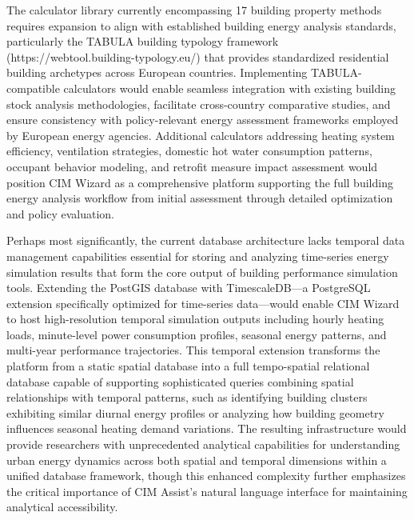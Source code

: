 The calculator library currently encompassing 17 building property methods requires expansion to align with established building energy analysis standards, particularly the TABULA building typology framework (https://webtool.building-typology.eu/) that provides standardized residential building archetypes across European countries. Implementing TABULA-compatible calculators would enable seamless integration with existing building stock analysis methodologies, facilitate cross-country comparative studies, and ensure consistency with policy-relevant energy assessment frameworks employed by European energy agencies. Additional calculators addressing heating system efficiency, ventilation strategies, domestic hot water consumption patterns, occupant behavior modeling, and retrofit measure impact assessment would position CIM Wizard as a comprehensive platform supporting the full building energy analysis workflow from initial assessment through detailed optimization and policy evaluation.

Perhaps most significantly, the current database architecture lacks temporal data management capabilities essential for storing and analyzing time-series energy simulation results that form the core output of building performance simulation tools. Extending the PostGIS database with TimescaleDB—a PostgreSQL extension specifically optimized for time-series data—would enable CIM Wizard to host high-resolution temporal simulation outputs including hourly heating loads, minute-level power consumption profiles, seasonal energy patterns, and multi-year performance trajectories. This temporal extension transforms the platform from a static spatial database into a full tempo-spatial relational database capable of supporting sophisticated queries combining spatial relationships with temporal patterns, such as identifying building clusters exhibiting similar diurnal energy profiles or analyzing how building geometry influences seasonal heating demand variations. The resulting infrastructure would provide researchers with unprecedented analytical capabilities for understanding urban energy dynamics across both spatial and temporal dimensions within a unified database framework, though this enhanced complexity further emphasizes the critical importance of CIM Assist's natural language interface for maintaining analytical accessibility.

